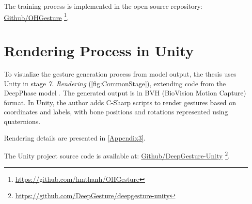 The training process is implemented in the open-source repository: \hyperlink{https://github.com/hmthanh/OHGesture}{Github/OHGesture} \footnote{\url{https://github.com/hmthanh/OHGesture}}.

\section{Rendering Process in Unity}
\label{sec:Render}

To visualize the gesture generation process from model output, the thesis uses Unity in stage \textit{7. Rendering} (\autoref{fig:CommonStage}), extending code from the DeepPhase model \cite{starke2022deepphase}. The generated output is in BVH (BioVision Motion Capture) format. In Unity, the author adds C-Sharp scripts to render gestures based on coordinates and labels, with bone positions and rotations represented using quaternions.

Rendering details are presented in \autoref{Appendix3}.

The Unity project source code is available at: \hyperlink{https://github.com/DeepGesture/deepgesture-unity}{Github/DeepGesture-Unity}
\footnote{\url{https://github.com/DeepGesture/deepgesture-unity}}.

